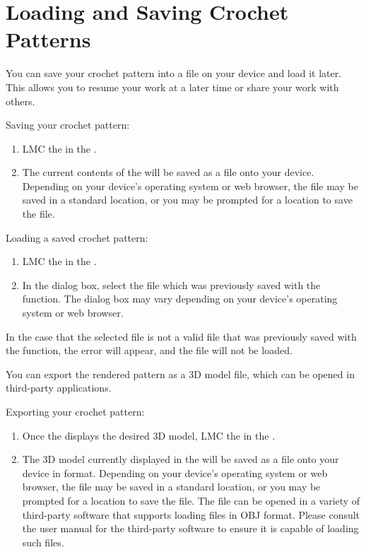 \documentclass[main.tex]{subfiles}
\begin{document}
\section{Loading and Saving Crochet Patterns}

You can save your crochet pattern into a file on your device and load it later. This allows you to resume your work at a later time or share your work with others.

Saving your crochet pattern:
\begin{enumerate}
\item LMC the \DB* in the \MenuBar*.
\item The current contents of the \PTI{} will be saved as a file onto your device. Depending on your device's operating system or web browser, the file may be saved in a standard location, or you may be prompted for a location to save the file.
\end{enumerate}

Loading a saved crochet pattern:
\begin{enumerate}
\item LMC the \UB* in the \MenuBar*.
\item In the dialog box, select the file which was previously saved with the  function. The dialog box may vary depending on your device's operating system or web browser.
\end{enumerate}
In the case that the selected file is not a valid file that was previously saved with the  function, the error  will appear, and the file will not be loaded.

You can export the rendered pattern as a 3D model file, which can be opened in third-party applications.

Exporting your crochet pattern:
\begin{enumerate}
\item Once the \CRW{} displays the desired 3D model, LMC the \EB* in the \MenuBar*.
\item The 3D model currently displayed in the \CRW{} will be saved as a file onto your device in  format. Depending on your device's operating system or web browser, the file may be saved in a standard location, or you may be prompted for a location to save the file. The file can be opened in a variety of third-party software that supports loading files in OBJ format. Please consult the user manual for the third-party software to ensure it is capable of loading such files.
\end{enumerate}
\end{document}
